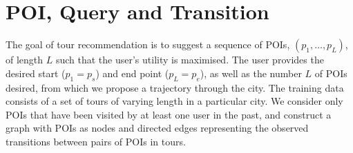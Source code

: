 
\secmoveup
\section{POI, Query and Transition}
\label{sec:feature}

The goal of tour recommendation is to suggest a sequence of POIs, $(p_1, \ldots, p_L)$, of length $L$ such that the user's utility is maximised. The user provides the desired start ($p_1=p_s$) and end point ($p_L=p_e$), as well as the number $L$ of POIs desired, from which we propose a trajectory through the city.
%
%
The training data consists of a set of tours of varying length in a particular city.
We consider only POIs that have been visited by at least one user in the past, and
construct a graph with POIs as nodes and directed edges representing the observed transitions between pairs of POIs in tours. %




